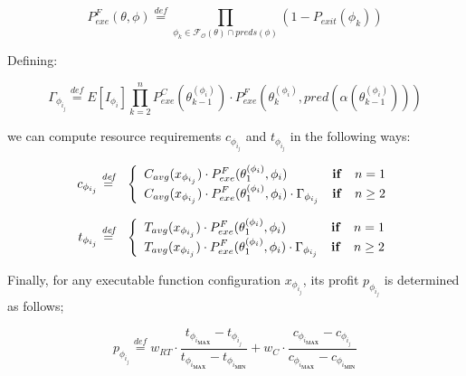 \documentclass[10pt,a4paper]{report}
\newcommand{\mathDef}{\overset{\textit{def}}{=}}
\theoremstyle{definition}
\begin{document}
\begin{equation}
	P_{exe}^{F}(\theta, \phi) \mathDef \prod_{\phi_k \in \mathscr{F_O}(\theta) \cap preds(\phi)} (1 - P_{exit}(\phi_k))
\end{equation}

Defining:

\begin{equation}
	\Gamma_{\phi_{i_{j}}} \mathDef E[I_{\phi_i}] \prod_{k = 2}^{n}  P_{exe}^C(\theta^{(\phi_i)}_{k-1}) \cdot P_{exe}^{F}(\theta^{(\phi_i)}_{k}, pred(\alpha(\theta^{(\phi_i)}_{k-1})))
\end{equation}

we can compute resource requirements $c_{\phi_{i_{j}}}$ and $t_{\phi_{i_{j}}}$ in the following ways:


\begin{eqnarray}
	c_{\phi_{i_{j}}} & \mathDef & \left\{ 
	\begin{array}{lcl}
		C_{avg}(x_{\phi_{i_{j}}}) \cdot P_{exe}^{F}(\theta^{(\phi_i)}_1, \phi_i) & \text{\textbf{if}} & n = 1 \\ 
		\displaystyle C_{avg}(x_{\phi_{i_{j}}}) \cdot P_{exe}^{F}(\theta^{(\phi_i)}_1, \phi_i) \cdot \Gamma_{\phi_{i_{j}}} & \text{\textbf{if}} & n \geq 2 \\ 
	\end{array} \right.
\end{eqnarray}

\begin{eqnarray}
	t_{\phi_{i_{j}}} & \mathDef & \left\{ 
	\begin{array}{lcl}
		T_{avg}(x_{\phi_{i_{j}}}) \cdot P_{exe}^{F}(\theta^{(\phi_i)}_1, \phi_i) & \text{\textbf{if}} & n = 1 \\ 
		\displaystyle T_{avg}(x_{\phi_{i_{j}}}) \cdot P_{exe}^{F}(\theta^{(\phi_i)}_1, \phi_i) \cdot \Gamma_{\phi_{i_{j}}} & \text{\textbf{if}} & n \geq 2 \\ 
	\end{array} \right.
\end{eqnarray}





Finally, for any executable function configuration $x_{\phi_{i_j}}$, its profit $p_{\phi_{i_{j}}}$ is determined as follows;

\begin{equation}
	p_{\phi_{i_{j}}} \mathDef w_{RT} \cdot \dfrac{t_{\phi_{i_{\textbf{MAX}}}} - t_{\phi_{i_{j}}}}{t_{\phi_{i_{\textbf{MAX}}}} - t_{\phi_{i_{\textbf{MIN}}}}} + w_{C} \cdot \dfrac{c_{\phi_{i_{\textbf{MAX}}}} - c_{\phi_{i_{j}}}}{c_{\phi_{i_{\textbf{MAX}}}} - c_{\phi_{i_{\textbf{MIN}}}}}
\end{equation}
\end{document}
